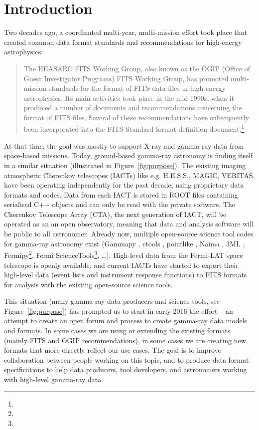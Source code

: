 \section{Introduction}

Two decades ago, a coordinated multi-year, multi-mission effort took place that created common data format standards and recommendations for high-energy astrophysics:

\begin{quotation}
The HEASARC FITS Working Group, also known as the OGIP (Office of Guest Investigator Programs) FITS Working Group, has promoted multi-mission standards for the format of FITS data files in high-energy astrophysics. Its main activities took place in the mid-1990s, when it produced a number of documents and recommendations concerning the format of FITS files. Several of these recommendations have subsequently been incorporated into the FITS Standard format definition document.\footnote{\ogip}
\end{quotation}

At that time, the goal was mostly to support X-ray and gamma-ray data from space-based missions. Today, ground-based gamma-ray astronomy is finding itself in a similar situation (illustrated in Figure~\ref{fig:purpose}). The existing imaging atmospheric Cherenkov telescopes (IACTs) like e.g. H.E.S.S., MAGIC, VERITAS, have been operating independently for the past decade, using proprietary data formats and codes. Data from each IACT is stored in ROOT files containing serialised C++ objects and can only be read with the private software. The Cherenkov Telescope Array (CTA), the next generation of IACT, will be operated as an an open observatory, meaning that data and analysis software will be public to all astronomer. Already now, multiple open-source science tool codes for gamma-ray astronomy exist (Gammapy \cite{2015arXiv150907408D}, ctools \cite{2016AnA...593A...1K}, pointlike \citep{2010PhDT.......147K}, Naima \citep{2015arXiv150903319Z}, 3ML \citep{2015arXiv150708343V}, Fermipy\footnote{\fermipy}, Fermi ScienceTools\footnote{\fermist}, \ldots). High-level data from the Fermi-LAT space telescope is openly available, and current IACTs have started to export their high-level data (event lists and instrument response functions) to FITS formats for analysis with the existing open-source science tools.

This situation (many gamma-ray data producers and science tools, see Figure~\ref{fig:purpose}) has prompted us to start in early 2016 the \gadf effort -- an attempt to create an open forum and process to create gamma-ray data models and formats. In some cases we are using or extending the existing formats (mainly FITS and OGIP recommendations), in some cases we are creating new formats that more directly reflect our use cases. The goal is to improve collaboration between people working on this topic, and to produce data format specifications to help data producers, tool developers, and astronomers working with high-level gamma-ray data.

